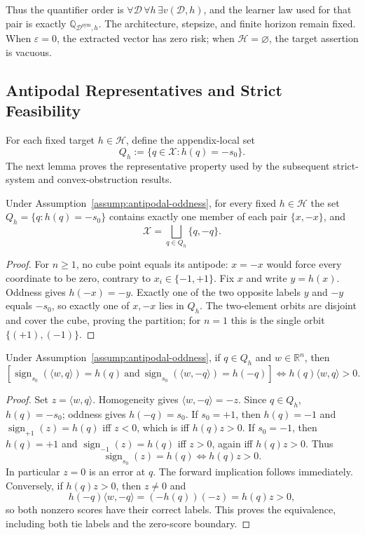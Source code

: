 Thus the quantifier order is
$\forall\mathcal D\,\forall h\,\exists v(\mathcal D,h)$, and the learner law
used for that pair is exactly
$\mathbb Q_{\mathcal D^{\mathrm{sym}},h}$.  The architecture, stepsize, and
finite horizon remain fixed.  When $\varepsilon=0$, the extracted vector has
zero risk; when $\mathcal H=\varnothing$, the target assertion is vacuous.

\subsection{Antipodal Representatives and Strict Feasibility}
\label{app:strict-interface}

For each fixed target $h\in\mathcal H$, define the appendix-local set
\[
 Q_h:=\{q\in\mathcal X:h(q)=-s_0\}.
\]
The next lemma proves the representative property used by the subsequent
strict-system and convex-obstruction results.

\begin{lemma}
\label{lem:step-004-representatives}
Under Assumption~\ref{assump:antipodal-oddness}, for every fixed
$h\in\mathcal H$ the set $Q_h=\{q:h(q)=-s_0\}$ contains exactly one
member of each pair $\{x,-x\}$, and
\[
\mathcal X=\bigsqcup_{q\in Q_h}\{q,-q\}.
\]
\end{lemma}

\begin{proof}
For $n\geq1$, no cube point equals its antipode: $x=-x$ would force every
coordinate to be zero, contrary to $x_i\in\{-1,+1\}$.  Fix $x$ and write
$y=h(x)$.  Oddness gives $h(-x)=-y$.  Exactly one of the two opposite labels
$y$ and $-y$ equals $-s_0$, so exactly one of $x,-x$ lies in $Q_h$.  The
two-element orbits are disjoint and cover the cube, proving the partition;
for $n=1$ this is the single orbit $\{(+1),(-1)\}$.
\end{proof}

\begin{lemma}
\label{lem:step-004-pairwise-strictness}
Under Assumption~\ref{assump:antipodal-oddness}, if $q\in Q_h$ and
$w\in\mathbb R^n$, then
\[
\left[
\operatorname{sign}_{s_0}(\langle w,q\rangle)=h(q)\ \text{and}\ 
\operatorname{sign}_{s_0}(\langle w,-q\rangle)=h(-q)
\right]
\Longleftrightarrow h(q)\langle w,q\rangle>0.
\]
\end{lemma}

\begin{proof}
Set $z=\langle w,q\rangle$.  Homogeneity gives
$\langle w,-q\rangle=-z$.  Since $q\in Q_h$, $h(q)=-s_0$; oddness gives
$h(-q)=s_0$.  If $s_0=+1$, then $h(q)=-1$ and
$\operatorname{sign}_{+1}(z)=h(q)$ iff $z<0$, which is iff
$h(q)z>0$.  If $s_0=-1$, then $h(q)=+1$ and
$\operatorname{sign}_{-1}(z)=h(q)$ iff $z>0$, again iff $h(q)z>0$.  Thus
\[
\operatorname{sign}_{s_0}(z)=h(q)
\Longleftrightarrow h(q)z>0.
\]
In particular $z=0$ is an error at $q$.  The forward implication follows
immediately.  Conversely, if $h(q)z>0$, then $z\neq0$ and
\[
 h(-q)\langle w,-q\rangle=(-h(q))(-z)=h(q)z>0,
\]
so both nonzero scores have their correct labels.  This proves the
equivalence, including both tie labels and the zero-score boundary.
\end{proof}

